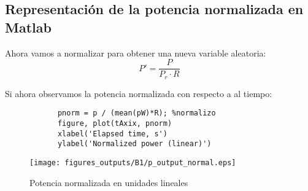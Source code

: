 \documentclass{article}
\begin{document}
    \subsection{Representación de la potencia normalizada en Matlab}
        \par Ahora vamos a normalizar para obtener una nueva variable aleatoria:
        \begin{equation}
            P' = \frac{P}{P_r \cdot R}
        \end{equation}
        \par Si ahora observamos la potencia normalizada con respecto a al tiempo:
        \begin{lstlisting}
            pnorm = p / (mean(pW)*R); %normalizo
            figure, plot(tAxix, pnorm)
            xlabel('Elapsed time, s')
            ylabel('Normalized power (linear)')
        \end{lstlisting}
        \begin{figure}[h]
            \centering
            \texttt{[image: figures\_outputs/B1/p\_output\_normal.eps]}
            \caption{Potencia normalizada en unidades lineales}
            \label{fig:pot_unidades_lineal}
        \end{figure}
\end{document}
